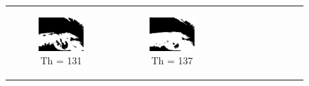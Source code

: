 \begin{figure}[htbp]
\begin{tabular}{cccc}
\begin{subfigure}{0.2\linewidth}
    \includegraphics[width=\linewidth]{plots/thresholding/th12}
    \caption{Th = 131}
    \end{subfigure} &
    \begin{subfigure}{0.2\linewidth}
    \centering
    \includegraphics[width=\linewidth]{plots/thresholding/th13}
    \caption{Th = 137}
    \end{subfigure} &
    \begin{subfigure}{0.2\linewidth}
    \centering

\end{subfigure}
\end{tabular}
\end{figure}
